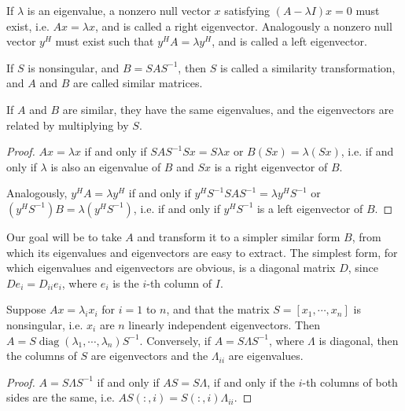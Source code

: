 \documentclass[11pt]{article}
\numberwithin{equation}{section}
\begin{document}
\begin{definition}
    If $\lambda$ is an eigenvalue, a nonzero null vector $x$ satisfying $(A-\lambda I)x = 0$ must exist, i.e. $Ax = \lambda x$, 
    and is called a right eigenvector. Analogously a nonzero null vector $y^H$ must exist such that $y^H A = \lambda y^H$, and is called a left eigenvector.
\end{definition}

\begin{definition}
    If $S$ is nonsingular, and $B = SAS^{-1}$, then $S$ is called a similarity transformation, and $A$ and $B$ are called similar matrices.    
\end{definition}

\begin{lemma}
    If $A$ and $B$ are similar, they have the same eigenvalues, and the eigenvectors are related by multiplying by $S$.
    \begin{proof}
        $Ax = \lambda x$ if and only if $SAS^{-1}Sx = S\lambda x$ or $B(Sx) = \lambda (Sx)$, 
        i.e. if and only if $\lambda$ is also an eigenvalue of $B$ and $Sx$ is a right eigenvector of $B$.

        Analogously, $y^H A = \lambda y^H$ if and only if $y^H S^{-1}SAS^{-1}=\lambda y^H S^{-1}$ or $(y^H S^{-1})B = \lambda (y^H S^{-1})$,
        i.e. if and only if $y^H S^{-1}$ is a left eigenvector of $B$.
    \end{proof}
\end{lemma}

Our goal will be to take $A$ and transform it to a simpler similar form $B$, from which its eigenvalues and eigenvectors are easy to extract. The simplest form, 
for which eigenvalues and eigenvectors are obvious, is a diagonal matrix $D$, since $D e_i = D_{ii} e_i$, where $e_i$ is the $i$-th column of $I$.

\begin{lemma}
    Suppose $A x=\lambda_{i} x_{i}$ for $i=1$ to $n$, and that the matrix $S=\left[x_{1}, \cdots, x_{n}\right]$ is nonsingular, 
    i.e. $x_i$ are $n$ linearly independent eigenvectors. Then $A = S \operatorname{diag}(\lambda_1, \cdots, \lambda_n)S^{-1}$. 
    Conversely, if $A = S \Lambda S^{-1}$, where $\Lambda$ is diagonal, then the columns of $S$ are eigenvectors and the $\Lambda_{ii}$ are eigenvalues.
    \begin{proof}
        $A = S \Lambda S^{-1}$ if and only if $AS=S\Lambda$, if and only if the $i$-th columns of both sides are the same, i.e. $AS(:,i) = S(:,i)\Lambda_{ii}$.
    \end{proof}
\end{lemma}
\end{document}
